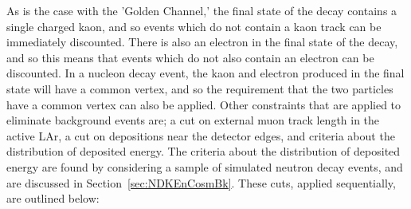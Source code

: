 As is the case with the 'Golden Channel,' the final state of the decay contains a single charged kaon, and so events which do not contain a kaon track can be immediately discounted. There is also an electron in the final state of the decay, and so this means that events which do not also contain an electron can be discounted. In a nucleon decay event, the kaon and electron produced in the final state will have a common vertex, and so the requirement that the two particles have a common vertex can also be applied. Other constraints that are applied to eliminate background events are; a cut on external muon track length in the active LAr, a cut on depositions near the detector edges, and criteria about the distribution of deposited energy. The criteria about the distribution of deposited energy are found by considering a sample of simulated neutron decay events, and are discussed in Section~\ref{sec:NDKEnCosmBk}. These cuts, applied sequentially, are outlined below:
